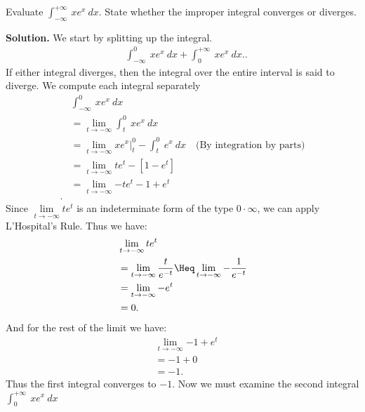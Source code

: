 \documentclass{report}
\begin{document}
        \bigbreak \noindent 
        \begin{eg}
            Evaluate $\int_{-\infty}^{+\infty}\ xe^{x}\ dx$.  State whether the improper integral converges or diverges.
        \end{eg}
        \bigbreak \noindent 
        \textbf{Solution.} We start by splitting up the integral.
        \begin{align*}
            &\int_{-\infty}^{0}\ xe^{x}\ dx + \int_{0}^{+\infty}\ xe^{x}\ dx.
        .\end{align*}
        If either integral diverges, then the integral over the entire interval is said to diverge. We compute each integral separately 
        \begin{align*}
            &\int_{-\infty}^{0}\ xe^{x}\ dx \\
            &=\lim\limits_{t \to -\infty}{\int_{t}^{0}\ xe^{x}\ dx} \\
            &=\lim\limits_{t \to -\infty}{xe^{x}\bigg|_t^{0}- \int_{t}^{0}\ e^{x}\ dx} \quad \text{(By integration by parts)} \\
            &= \lim\limits_{t \to -\infty}{te^{t} -[1-e^{t}]} \\
            &= \lim\limits_{t \to -\infty}{-te^{t} -1+e^{t}} \\
        .\end{align*}
        \bigbreak \noindent 
        Since $\lim\limits_{t \to -\infty}{te^{t}}$ is an indeterminate  form of the type $0 \cdot \infty$, we can apply L'Hospital's Rule. Thus we have:
        \begin{align*}
            &\lim\limits_{t \to -\infty}{te^{t}}  \\
            &= \lim\limits_{t \to -\infty}{\frac{t}{e^{-t}}}\Heq \lim\limits_{t \to -\infty}{-\frac{1}{e^{-t}}} \\
            &= \lim\limits_{t \to -\infty}{-e^{t}} \\
            &=0
        .\end{align*}
        And for the rest of the limit we have:
        \begin{align*}
            &\lim\limits_{t \to -\infty}{-1+e^{t}} \\
            &=-1 + 0 \\
            &=-1
        .\end{align*}
        \bigbreak \noindent 
        Thus the first integral converges to $-1$. Now we must examine the second integral $\int_{0}^{+\infty}\ xe^{x}\ dx$
\end{document}
